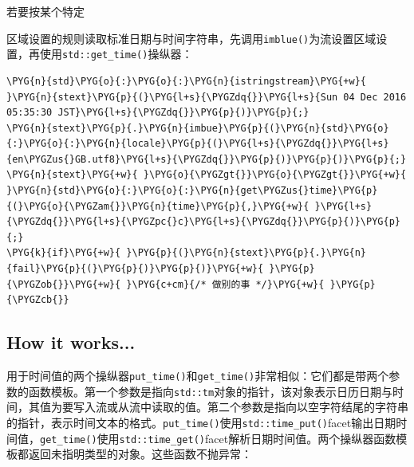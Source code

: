 
若要按某个特定



区域设置的规则读取标准日期与时间字符串，先调用\texttt{imblue()}为流设置区域设置，再使用\texttt{std::\allowbreak{}get\_\allowbreak{}time()}操纵器：



\begin{codeblockbg}
\begin{Verbatim}[commandchars=\\\{\},breaklines=true,breakanywhere=true,fontsize=\codefont,xleftmargin=17bp]
\PYG{n}{std}\PYG{o}{:}\PYG{o}{:}\PYG{n}{istringstream}\PYG{+w}{ }\PYG{n}{stext}\PYG{p}{(}\PYG{l+s}{\PYGZdq{}}\PYG{l+s}{Sun 04 Dec 2016 05:35:30 JST}\PYG{l+s}{\PYGZdq{}}\PYG{p}{)}\PYG{p}{;}
\PYG{n}{stext}\PYG{p}{.}\PYG{n}{imbue}\PYG{p}{(}\PYG{n}{std}\PYG{o}{:}\PYG{o}{:}\PYG{n}{locale}\PYG{p}{(}\PYG{l+s}{\PYGZdq{}}\PYG{l+s}{en\PYGZus{}GB.utf8}\PYG{l+s}{\PYGZdq{}}\PYG{p}{)}\PYG{p}{)}\PYG{p}{;}
\PYG{n}{stext}\PYG{+w}{ }\PYG{o}{\PYGZgt{}}\PYG{o}{\PYGZgt{}}\PYG{+w}{ }\PYG{n}{std}\PYG{o}{:}\PYG{o}{:}\PYG{n}{get\PYGZus{}time}\PYG{p}{(}\PYG{o}{\PYGZam{}}\PYG{n}{time}\PYG{p}{,}\PYG{+w}{ }\PYG{l+s}{\PYGZdq{}}\PYG{l+s}{\PYGZpc{}c}\PYG{l+s}{\PYGZdq{}}\PYG{p}{)}\PYG{p}{;}
\PYG{k}{if}\PYG{+w}{ }\PYG{p}{(}\PYG{n}{stext}\PYG{p}{.}\PYG{n}{fail}\PYG{p}{(}\PYG{p}{)}\PYG{p}{)}\PYG{+w}{ }\PYG{p}{\PYGZob{}}\PYG{+w}{ }\PYG{c+cm}{/* 做别的事 */}\PYG{+w}{ }\PYG{p}{\PYGZcb{}}
\end{Verbatim}
\end{codeblockbg}



\subsection{How it works...}



用于时间值的两个操纵器\texttt{put\_\allowbreak{}time()}和\texttt{get\_\allowbreak{}time()}非常相似：它们都是带两个参数的函数模板。第一个参数是指向\texttt{std::\allowbreak{}tm}对象的指针，该对象表示日历日期与时间，其值为要写入流或从流中读取的值。第二个参数是指向以空字符结尾的字符串的指针，表示时间文本的格式。\texttt{put\_\allowbreak{}time()}使用\texttt{std::\allowbreak{}time\_\allowbreak{}put()}facet输出日期时间值，\texttt{get\_\allowbreak{}time()}使用\texttt{std::\allowbreak{}time\_\allowbreak{}get()}facet解析日期时间值。两个操纵器函数模板都返回未指明类型的对象。这些函数不抛异常：


